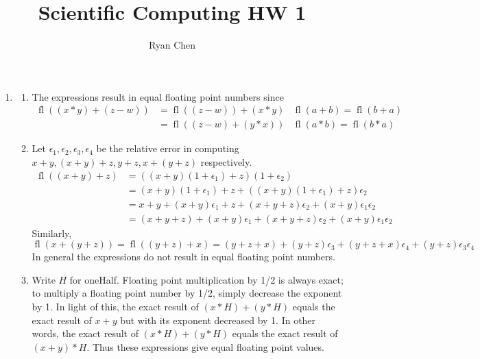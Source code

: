 \documentclass{article}
\title{Scientific Computing HW 1}
\author{Ryan Chen}
\newcommand{\e}{\epsilon}
\DeclareMathOperator{\fl}{fl}
\begin{document}
	
\maketitle



\begin{enumerate}
	
	
	
	\item
	
	\begin{enumerate}
		
		
		
		\item The expressions result in equal floating point numbers since
		\begin{align*}
			\fl((x*y)+(z-w)) &= \fl((z-w))+(x*y) & \fl(a+b)=\fl(b+a) \\
			&= \fl((z-w)+(y*x)) & \fl(a*b)=\fl(b*a)
		\end{align*}
	
	
	
		\item Let $\e_1,\e_2,\e_3,\e_4$ be the relative error in computing $x+y,(x+y)+z,y+z,x+(y+z)$ respectively.
		\begin{align*}
			\fl((x+y)+z) &= ((x+y)(1+\e_1)+z)(1+\e_2) \\
			&= (x+y)(1+\e_1) + z + ((x+y)(1+\e_1)+z)\e_2 \\
			&= x + y + (x+y)\e_1 + z + (x+y+z)\e_2 + (x+y)\e_1\e_2 \\
			&= (x+y+z) + (x+y)\e_1 + (x+y+z)\e_2 + (x+y)\e_1\e_2
		\end{align*}
		Similarly,
		\[\fl(x+(y+z)) = \fl((y+z)+x) = (y+z+x) + (y+z)\e_3 + (y+z+x)\e_4 + (y+z)\e_3\e_4\]
		In general the expressions do not result in equal floating point numbers.
		
		
		
		\item Write $H$ for oneHalf. Floating point multiplication by 1/2 is always exact; to multiply a floating point number by 1/2, simply decrease the exponent by 1. In light of this, the exact result of $(x*H)+(y*H)$ equals the exact result of $x+y$ but with its exponent decreased by 1. In other words, the exact result of $(x*H)+(y*H)$ equals the exact result of $(x+y)*H$. Thus these expressions give equal floating point values.
		
		
		

\end{enumerate}
\end{enumerate}
\end{document}
